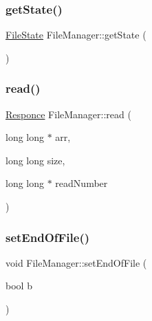 \hypertarget{class_file_manager_abd4cbc2b218ab1828ae376a4a9137057}{}\label{class_file_manager_abd4cbc2b218ab1828ae376a4a9137057} 
\subsubsection{\texorpdfstring{get\+State()}{getState()}}
{\footnotesize\ttfamily \hyperlink{_structures_8h_a57306ae0f9e356347388234ed69e0ce7}{File\+State} File\+Manager\+::get\+State (\begin{DoxyParamCaption}{ }\end{DoxyParamCaption})}

\hypertarget{class_file_manager_aba031d681752c80f52a8a8af9b69834e}{}\label{class_file_manager_aba031d681752c80f52a8a8af9b69834e} 
\subsubsection{\texorpdfstring{read()}{read()}}
{\footnotesize\ttfamily \hyperlink{_structures_8h_a9864d6ef28dd6e38416afac4426b3491}{Responce} File\+Manager\+::read (\begin{DoxyParamCaption}\item[{long long $\ast$}]{arr,  }\item[{long long}]{size,  }\item[{long long $\ast$}]{read\+Number }\end{DoxyParamCaption})}

\hypertarget{class_file_manager_ace8ce2677414831b5a9e7030248fc832}{}\label{class_file_manager_ace8ce2677414831b5a9e7030248fc832} 
\subsubsection{\texorpdfstring{set\+End\+Of\+File()}{setEndOfFile()}}
{\footnotesize\ttfamily void File\+Manager\+::set\+End\+Of\+File (\begin{DoxyParamCaption}\item[{bool}]{b }\end{DoxyParamCaption})}

\hypertarget{class_file_manager_ab364b91193c482fc7387aec162f677ad}{}\label{class_file_manager_ab364b91193c482fc7387aec162f677ad} 
